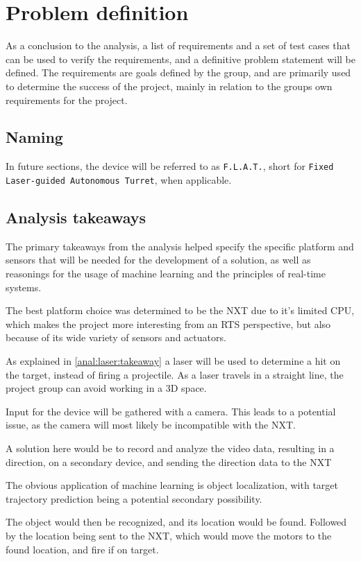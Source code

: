 \newpage
\section{Problem definition}
As a conclusion to the analysis, a list of requirements and a set of test cases that can be used to verify the requirements, and a definitive problem statement will be defined.
The requirements are goals defined by the group, and are primarily used to determine the success of the project, mainly in relation to the groups own requirements for the project.

\subsection{Naming}
In future sections, the device will be referred to as \texttt{F.L.A.T.}, short for \texttt{Fixed Laser-guided Autonomous Turret}, when applicable.

\subsection{Analysis takeaways}
The primary takeaways from the analysis helped specify the specific platform and sensors that will be needed for the development of a solution, as well as reasonings for the usage of machine learning and the principles of real-time systems.

The best platform choice was determined to be the NXT due to it's limited CPU, which makes the project more interesting from an RTS perspective, but also because of its wide variety of sensors and actuators.


As explained in \autoref{anal:laser:takeaway} a laser will be used to determine a hit on the target, instead of firing a projectile.
As a laser travels in a straight line, the project group can avoid working in a 3D space.


Input for the device will be gathered with a camera.
This leads to a potential issue, as the camera will most likely be incompatible with the NXT.

A solution here would be to record and analyze the video data, resulting in a direction, on a secondary device, and sending the direction data to the NXT

The obvious application of machine learning is object localization, with target trajectory prediction being a potential secondary possibility.

The object would then be recognized, and its location would be found.
Followed by the location being sent to the NXT, which would move the motors to the found location, and fire if on target.


